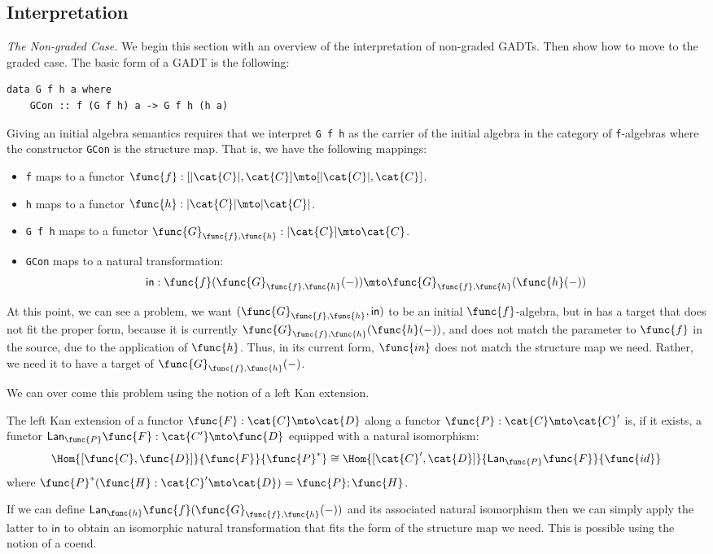 \subsection{Interpretation}
\label{subsec:interpretation}
\emph{The Non-graded Case.} We begin this section with an overview of
the interpretation of non-graded GADTs.  Then show how to move to the
graded case. The basic form of a GADT is the following:
\begin{verbatim}
data G f h a where
    GCon :: f (G f h) a -> G f h (h a)
\end{verbatim}
Giving an initial algebra semantics requires that we interpret 
\verb!G f h! as the carrier of the initial algebra in the category 
of \verb!f!-algebras where the constructor \verb!GCon! is the 
structure map.  That is, we have the following mappings:
\begin{itemize}
    \item \verb!f! maps to a functor $\func{f} : [|\cat{C}|,\cat{C}]
    \mto [|\cat{C}|, \cat{C}]$.

    \item \verb!h! maps to a functor $\func{h} : |\cat{C}| \mto
    |\cat{C}|$. 

    \item \verb!G f h! maps to a functor 
$\func{G}_{\func{f},\func{h}} : |\cat{C}| \mto \cat{C}$.

    \item \verb!GCon! maps to a natural transformation:
          \[
            \mathsf{in} : \func{f}(\func{G}_{\func{f},\func{h}}(-)) \mto \func{G}_{\func{f},\func{h}}(\func{h}(-))
          \]
\end{itemize}
At this point, we can see a problem, we want $(\func{G}_{\func{f},\func{h}},
\mathsf{in})$ to be an initial $\func{f}$-algebra, but
$\mathsf{in}$ has a target that does not fit the proper form, because
it is currently $\func{G}_{\func{f},\func{h}}(\func{h}(-))$, and
does not match the parameter to $\func{f}$ in the source, due to
the application of $\func{h}$.  Thus, in its current form, $\func{in}$
does not match the structure map we need.  Rather, we need it to have
a target of $\func{G}_{\func{f},\func{h}}(-)$.

We can over come this problem using the notion of a left Kan
extension. 
\newcommand{\Lan}[2]{\mathsf{Lan}_{#1}#2}
\begin{definition}
\label{def:left_kan_extension}
The left Kan extension of a functor $\func{F} : \cat{C} \mto \cat{D}$
along a functor $\func{P} : \cat{C} \mto \cat{C}'$ is, if it exists, a
functor $\Lan{\func{P}}{\func{F}} : \cat{C'} \mto \func{D}$ equipped
with a natural isomorphism:
\[
    \Hom{[\func{C},\func{D}]}{\func{F}}{\func{P}^*} \cong \Hom{[\cat{C}',\cat{D}]}{\Lan{\func{P}}{\func{F}}}{\func{id}}
\]
where $\func{P}^*(\func{H} : \cat{C}' \mto \cat{D}) = \func{P};\func{H}$.
\end{definition}
\noindent
If we can define
$\Lan{\func{h}}{\func{f}(\func{G}_{\func{f},\func{h}}(-))}$ and its
associated natural isomorphism then we can simply apply the latter to
$\mathsf{in}$ to obtain an isomorphic natural transformation that fits
the form of the structure map we need. This is possible using the
notion of a coend.

